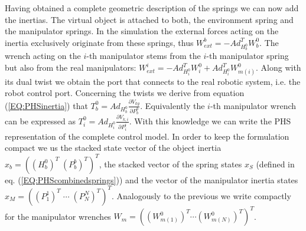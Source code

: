 \documentclass[a4paper,twoside, openright,12pt]{report}
\begin{document}
Having obtained a complete geometric description of the springs we can now add the inertias. The virtual object is attached to both, the environment spring and the manipulator springs. 
In the simulation the external forces acting on the inertia exclusively originate from these springs, thus $W_{ext}^b = - Ad_{H_b^0}^T W_b^0 $.
The wrench acting on the $i$-th manipulator stems from the $i$-th manipulator spring but also from the real manipulators: $ W_{ext}^i = -Ad_{H_i^0}^T W_i^0 + Ad_{H_i^0}^T W_{m(i)}^0$. Along with its dual twist we obtain the port that connects to the real robotic system, i.e. the robot control port. Concerning the twists we derive from equation (\ref{EQ:PHSinertia}) that $T_b^0 = Ad_{H_b^0}\frac{\partial V_{kg}}{\partial P_b^b}$. Equivalently the $i$-th manipulator wrench can be expressed as $T_i^0 = Ad_{H_i^0}\frac{\partial V_{k,i}}{\partial P_i^i} $. With this knowledge we can write the PHS representation of the complete control model. In order to keep the formulation compact we us the stacked state vector of the object inertia $x_b = ((H_b^0)^T \; (P_b^b)^T)^T$, the stacked vector of the spring states $x_S$ (defined in eq. (\ref{EQ:PHScombinedsprings})) and the vector of the manipulator inertia states $x_M = ((P_1^1)^T \; \cdots \; (P_N^N)^T)^T$. Analogously to the previous we write compactly for the manipulator wrenches $W_m = ((W_{m(1)}^0)^T \cdots (W_{m(N)}^0)^T)^T$. 
\end{document}
